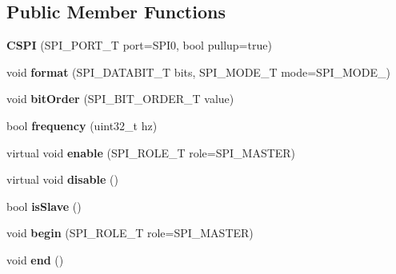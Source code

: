 \subsection*{Public Member Functions}
\begin{DoxyCompactItemize}
\item 
\hypertarget{class_c_s_p_i_a45ebc1852b74f5f0ccfbb97b302cf5e9}{{\bfseries C\-S\-P\-I} (S\-P\-I\-\_\-\-P\-O\-R\-T\-\_\-\-T port=S\-P\-I0, bool pullup=true)}\label{class_c_s_p_i_a45ebc1852b74f5f0ccfbb97b302cf5e9}

\item 
\hypertarget{class_c_s_p_i_accc9a5c831ee85e95f0bb5567de5f529}{void {\bfseries format} (S\-P\-I\-\_\-\-D\-A\-T\-A\-B\-I\-T\-\_\-\-T bits, S\-P\-I\-\_\-\-M\-O\-D\-E\-\_\-\-T mode=S\-P\-I\-\_\-\-M\-O\-D\-E\-\_)}\label{class_c_s_p_i_accc9a5c831ee85e95f0bb5567de5f529}

\item 
\hypertarget{class_c_s_p_i_aa7a160dad74689b9afb720c78d63558f}{void {\bfseries bit\-Order} (S\-P\-I\-\_\-\-B\-I\-T\-\_\-\-O\-R\-D\-E\-R\-\_\-\-T value)}\label{class_c_s_p_i_aa7a160dad74689b9afb720c78d63558f}

\item 
\hypertarget{class_c_s_p_i_ad8143fa5be48bc62762fda52b86d630a}{bool {\bfseries frequency} (uint32\-\_\-t hz)}\label{class_c_s_p_i_ad8143fa5be48bc62762fda52b86d630a}

\item 
\hypertarget{class_c_s_p_i_a7dc9ce9f0b38a59f7332e6f4f39864e8}{virtual void {\bfseries enable} (S\-P\-I\-\_\-\-R\-O\-L\-E\-\_\-\-T role=S\-P\-I\-\_\-\-M\-A\-S\-T\-E\-R)}\label{class_c_s_p_i_a7dc9ce9f0b38a59f7332e6f4f39864e8}

\item 
\hypertarget{class_c_s_p_i_a5009ac7cc08bcf2b1d1be19b320424e6}{virtual void {\bfseries disable} ()}\label{class_c_s_p_i_a5009ac7cc08bcf2b1d1be19b320424e6}

\item 
\hypertarget{class_c_s_p_i_ab237c0acc917287a8f7cdca7e91e87c6}{bool {\bfseries is\-Slave} ()}\label{class_c_s_p_i_ab237c0acc917287a8f7cdca7e91e87c6}

\item 
\hypertarget{class_c_s_p_i_a98fb4712f52c9977d4973430f5f505b8}{void {\bfseries begin} (S\-P\-I\-\_\-\-R\-O\-L\-E\-\_\-\-T role=S\-P\-I\-\_\-\-M\-A\-S\-T\-E\-R)}\label{class_c_s_p_i_a98fb4712f52c9977d4973430f5f505b8}

\item 
\hypertarget{class_c_s_p_i_a9a8f9843e54bf4f11dd871cf798fe337}{void {\bfseries end} ()}\label{class_c_s_p_i_a9a8f9843e54bf4f11dd871cf798fe337}


\end{DoxyCompactItemize}
